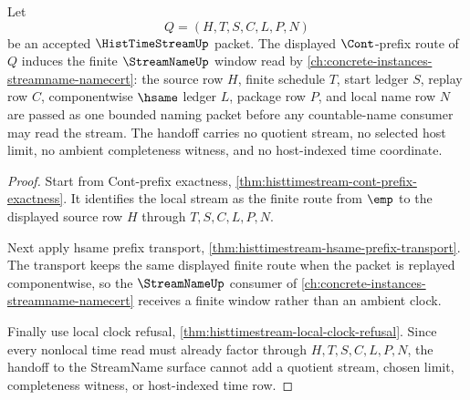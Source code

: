 \begin{theorem}
\label{thm:histtimestream-streamname-finite-window-handoff}
Let
$$
Q=(H,T,S,C,L,P,N)
$$
be an accepted $\HistTimeStreamUp$ packet. The displayed $\Cont$-prefix route of $Q$ induces the finite $\StreamNameUp$ window read by \autoref{ch:concrete-instances-streamname-namecert}: the source row $H$, finite schedule $T$, start ledger $S$, replay row $C$, componentwise $\hsame$ ledger $L$, package row $P$, and local name row $N$ are passed as one bounded naming packet before any countable-name consumer may read the stream. The handoff carries no quotient stream, no selected host limit, no ambient completeness witness, and no host-indexed time coordinate.
\end{theorem}
\begin{proof}
Start from Cont-prefix exactness, \autoref{thm:histtimestream-cont-prefix-exactness}. It identifies the local stream as the finite route from $\emp$ to the displayed source row $H$ through $T,S,C,L,P,N$.

Next apply hsame prefix transport, \autoref{thm:histtimestream-hsame-prefix-transport}. The transport keeps the same displayed finite route when the packet is replayed componentwise, so the $\StreamNameUp$ consumer of \autoref{ch:concrete-instances-streamname-namecert} receives a finite window rather than an ambient clock.

Finally use local clock refusal, \autoref{thm:histtimestream-local-clock-refusal}. Since every nonlocal time read must already factor through $H,T,S,C,L,P,N$, the handoff to the StreamName surface cannot add a quotient stream, chosen limit, completeness witness, or host-indexed time row.
\end{proof}

